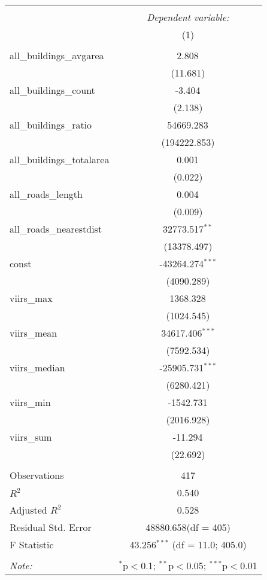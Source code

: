 \begin{table}[!htbp] \centering
\begin{tabular}{@{\extracolsep{5pt}}lc}
\\[-1.8ex]\hline
\hline \\[-1.8ex]
& \multicolumn{1}{c}{\textit{Dependent variable:}} \
\cr \cline{1-2}
\\[-1.8ex] & (1) \\
\hline \\[-1.8ex]
 all_buildings_avgarea & 2.808$^{}$ \\
  & (11.681) \\
 all_buildings_count & -3.404$^{}$ \\
  & (2.138) \\
 all_buildings_ratio & 54669.283$^{}$ \\
  & (194222.853) \\
 all_buildings_totalarea & 0.001$^{}$ \\
  & (0.022) \\
 all_roads_length & 0.004$^{}$ \\
  & (0.009) \\
 all_roads_nearestdist & 32773.517$^{**}$ \\
  & (13378.497) \\
 const & -43264.274$^{***}$ \\
  & (4090.289) \\
 viirs_max & 1368.328$^{}$ \\
  & (1024.545) \\
 viirs_mean & 34617.406$^{***}$ \\
  & (7592.534) \\
 viirs_median & -25905.731$^{***}$ \\
  & (6280.421) \\
 viirs_min & -1542.731$^{}$ \\
  & (2016.928) \\
 viirs_sum & -11.294$^{}$ \\
  & (22.692) \\
\hline \\[-1.8ex]
 Observations & 417 \\
 $R^2$ & 0.540 \\
 Adjusted $R^2$ & 0.528 \\
 Residual Std. Error & 48880.658(df = 405)  \\
 F Statistic & 43.256$^{***}$ (df = 11.0; 405.0) \\
\hline
\hline \\[-1.8ex]
\textit{Note:} & \multicolumn{1}{r}{$^{*}$p$<$0.1; $^{**}$p$<$0.05; $^{***}$p$<$0.01} \\
\end{tabular}
\end{table}